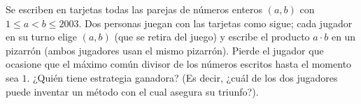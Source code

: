 Se escriben en tarjetas todas las parejas de números enteros $(a,b)$ con $1\leq a < b\leq 2003$. Dos personas juegan con las tarjetas como sigue; cada jugador en su turno elige $(a,b)$ (que se retira del juego) y escribe el producto $a\cdot b$ en un pizarrón (ambos jugadores usan el mismo pizarrón). Pierde el jugador que ocasione que el máximo común divisor de los números escritos hasta el momento sea $1$. ¿Quién tiene estrategia ganadora? (Es decir, ¿cuál de los dos jugadores puede inventar un método con el cual asegura su triunfo?). 
